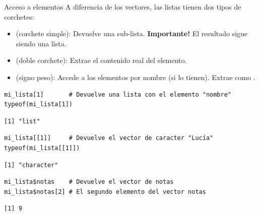 \documentclass[8pt]{beamer}
\begin{document}
	
\begin{frame}[fragile]{Acceso a elementos}
	A diferencia de los vectores, las listas tienen dos tipos de corchetes:

\begin{itemize}
	\item \rscript{[]} (corchete simple): Devuelve una sub-lista. \textbf{Importante!} El resultado sigue siendo una lista.
	\item \rscript{[[]]} (doble corchete): Extrae el contenido real del elemento.
	\item \rscript{$} (signo peso): Accede a los elementos por nombre (si lo tienen). Extrae como \rscript{[[]]}.
\end{itemize}	


\begin{lstlisting}[style=RScript]
mi_lista[1]       # Devuelve una lista con el elemento "nombre"
typeof(mi_lista[1])
\end{lstlisting}
\begin{lstlisting}[style=RConsole]
[1] "list"
\end{lstlisting}
\begin{lstlisting}[style=RScript]
mi_lista[[1]]     # Devuelve el vector de caracter "Lucía"
typeof(mi_lista[[1]])
\end{lstlisting}
\begin{lstlisting}[style=RConsole]
[1] "character"
\end{lstlisting}
\begin{lstlisting}[style=RScript]
mi_lista$notas    # Devuelve el vector de notas
mi_lista$notas[2] # El segundo elemento del vector notas
\end{lstlisting}
\begin{lstlisting}[style=RConsole]
[1] 9
\end{lstlisting}
\end{frame}
\end{document}
